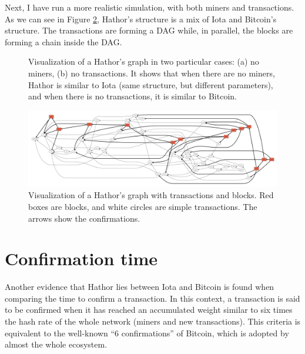 Next, I have run a more realistic simulation, with both miners and transactions. As we can see in Figure \ref{fig:hathor-dag}, Hathor's structure is a mix of Iota and Bitcoin's structure. The transactions are forming a DAG while, in parallel, the blocks are forming a chain inside the DAG.

\begin{figure}[!htb]
\centering
{}
\caption{Visualization of a Hathor's graph in two particular cases: (a) no miners, (b) no transactions. It shows that when there are no miners, Hathor is similar to Iota (same structure, but different parameters), and when there is no transactions, it is similar to Bitcoin.\label{fig:hathor-similarities}}
\end{figure}

\begin{figure}[!htb]
\centering\includegraphics[width=\textwidth]{./images01/sim/hathor.pdf}
\caption{Visualization of a Hathor's graph with transactions and blocks. Red boxes are blocks, and white circles are simple transactions. The arrows show the confirmations.\label{fig:hathor-dag}}
\end{figure}


\section{Confirmation time}

Another evidence that Hathor lies between Iota and Bitcoin is found when comparing the time to confirm a transaction. In this context, a transaction is said to be confirmed when it has reached an accumulated weight similar to six times the hash rate of the whole network (miners and new transactions). This criteria is equivalent to the well-known ``6 confirmations'' of Bitcoin, which is adopted by almost the whole ecosystem.

